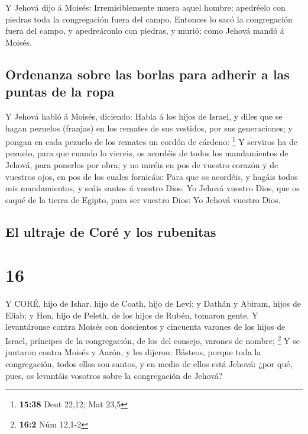  Y Jehová dijo á Moisés: Irremisiblemente muera aquel
hombre; apedréelo con piedras toda la congregación fuera del campo.
 Entonces lo sacó la congregación fuera del campo, y
apedreáronlo con piedras, y murió; como Jehová mandó á Moisés.

\hypertarget{ordenanza-sobre-las-borlas-para-adherir-a-las-puntas-de-la-ropa}{%
\subsection{Ordenanza sobre las borlas para adherir a las puntas de la
ropa}\label{ordenanza-sobre-las-borlas-para-adherir-a-las-puntas-de-la-ropa}}

 Y Jehová habló á Moisés, diciendo:  Habla á
los hijos de Israel, y diles que se hagan pezuelos (franjas) en los
remates de sus vestidos, por sus generaciones; y pongan en cada pezuelo
de los remates un cordón de cárdeno: \footnote{\textbf{15:38} Deut
  22,12; Mat 23,5}  Y serviros ha de pezuelo, para que
cuando lo viereis, os acordéis de todos los mandamientos de Jehová, para
ponerlos por obra; y no miréis en pos de vuestro corazón y de vuestros
ojos, en pos de los cuales fornicáis:  Para que os
acordéis, y hagáis todos mis mandamientos, y seáis santos á vuestro
Dios.  Yo Jehová vuestro Dios, que os saqué de la tierra de
Egipto, para ser vuestro Dios: Yo Jehová vuestro Dios.

\hypertarget{el-ultraje-de-coruxe9-y-los-rubenitas}{%
\subsection{El ultraje de Coré y los
rubenitas}\label{el-ultraje-de-coruxe9-y-los-rubenitas}}

\hypertarget{section-15}{%
\section{16}\label{section-15}}

 Y CORÉ, hijo de Ishar, hijo de Coath, hijo de Leví; y
Dathán y Abiram, hijos de Eliab; y Hon, hijo de Peleth, de los hijos de
Rubén, tomaron gente,  Y levantáronse contra Moisés con
doscientos y cincuenta varones de los hijos de Israel, príncipes de la
congregación, de los del consejo, varones de nombre; \footnote{\textbf{16:2}
  Núm 12,1-2}  Y se juntaron contra Moisés y Aarón, y les
dijeron: Básteos, porque toda la congregación, todos ellos son santos, y
en medio de ellos está Jehová: ¿por qué, pues, os levantáis vosotros
sobre la congregación de Jehová?

